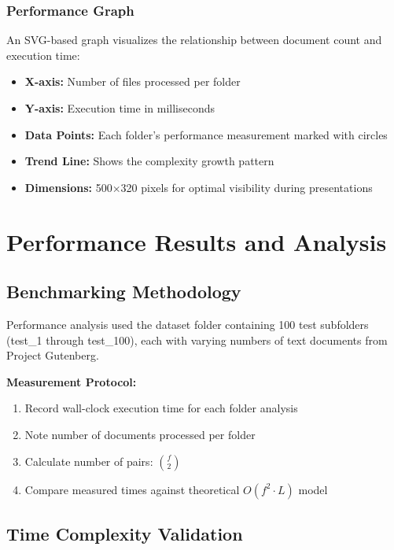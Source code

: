 \documentclass[12pt,oneside,openany]{report}
\begin{document}
\subsection{Performance Graph}

An SVG-based graph visualizes the relationship between document count and execution time:
\begin{itemize}
  \item \textbf{X-axis:} Number of files processed per folder
  \item \textbf{Y-axis:} Execution time in milliseconds
  \item \textbf{Data Points:} Each folder's performance measurement marked with circles
  \item \textbf{Trend Line:} Shows the complexity growth pattern
  \item \textbf{Dimensions:} 500×320 pixels for optimal visibility during presentations
\end{itemize}

\chapter{Performance Results and Analysis}

\section{Benchmarking Methodology}

Performance analysis used the dataset folder containing 100 test subfolders (test\_1 through test\_100), each with varying numbers of text documents from Project Gutenberg.

\textbf{Measurement Protocol:}
\begin{enumerate}
  \item Record wall-clock execution time for each folder analysis
  \item Note number of documents processed per folder
  \item Calculate number of pairs: ${f \choose 2}$
  \item Compare measured times against theoretical $O(f^2 \cdot L)$ model
\end{enumerate}

\section{Time Complexity Validation}
\end{document}
